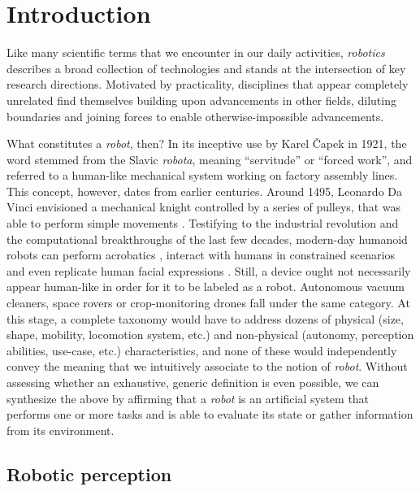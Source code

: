 \chapter{Introduction}
\label{ch:intro}


Like many scientific terms that we encounter in our daily activities, \emph{robotics} describes a broad collection of technologies and stands at the intersection of key research directions. Motivated by practicality, disciplines that appear completely unrelated find themselves building upon advancements in other fields, diluting boundaries and joining forces to enable otherwise-impossible advancements.

What constitutes a \emph{robot}, then? In its inceptive use by Karel Čapek \cite{roberts_robotics_history_1999} in 1921, the word stemmed from the Slavic \emph{robota}, meaning ``servitude'' or ``forced work'', and referred to a human-like mechanical system working on factory assembly lines. This concept, however, dates from earlier centuries. Around 1495, Leonardo Da Vinci envisioned a mechanical knight controlled by a series of pulleys, that was able to perform simple movements \cite{taddei_leonardo_robots_2008}. Testifying to the industrial revolution and the computational breakthroughs of the last few decades, modern-day humanoid robots can perform acrobatics \cite{bostondynamics_backflips_2023}, interact with humans in constrained scenarios \cite{humanoids_hospital} \cite{humanoid_school} \cite{humanoid_school2} and even replicate human facial expressions \cite{humanoid_facial}. Still, a device ought not necessarily appear human-like in order for it to be labeled as a robot. Autonomous vacuum cleaners, space rovers or crop-monitoring drones fall under the same category. At this stage, a complete taxonomy would have to address dozens of physical (size, shape, mobility, locomotion system, etc.) and non-physical (autonomy, perception abilities, use-case, etc.) characteristics, and none of these would independently convey the meaning that we intuitively associate to the notion of \emph{robot}. Without assessing whether an exhaustive, generic definition is even possible, we can synthesize the above by affirming that a \emph{robot} is an artificial system that performs one or more tasks and is able to evaluate its state or gather information from its environment.

\section{Robotic perception}

